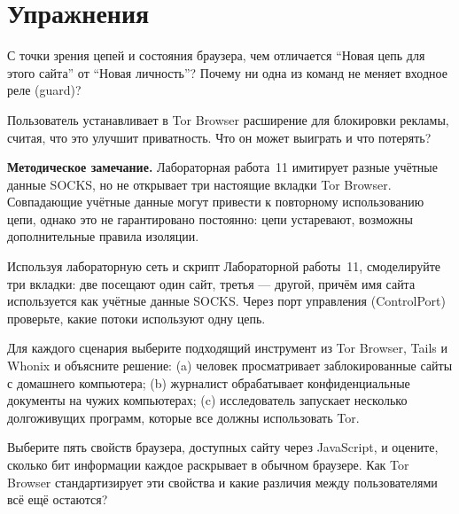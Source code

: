 \section*{Упражнения}

\begin{esercizio}[1]\label{es:23-identita}
С точки зрения цепей и состояния браузера, чем отличается \enquote{Новая цепь для этого сайта} от \enquote{Новая личность}? Почему ни одна из команд не меняет входное реле (guard)?
\end{esercizio}

\begin{esercizio}[1]\label{es:23-estensioni}
Пользователь устанавливает в Tor Browser расширение для блокировки рекламы, считая, что это улучшит приватность. Что он может выиграть и что потерять?
\end{esercizio}

\textbf{Методическое замечание.} Лабораторная работа~11 имитирует разные учётные данные SOCKS, но не открывает три настоящие вкладки Tor Browser. Совпадающие учётные данные могут привести к повторному использованию цепи, однако это не гарантировано постоянно: цепи устаревают, возможны дополнительные правила изоляции.

\begin{esercizio}[2]\label{es:23-isolamento}
Используя лабораторную сеть и скрипт Лабораторной работы~11, смоделируйте три вкладки: две посещают один сайт, третья — другой, причём имя сайта используется как учётные данные SOCKS. Через порт управления (ControlPort) проверьте, какие потоки используют одну цепь.
\end{esercizio}

\begin{esercizio}[2]\label{es:23-scelta}
Для каждого сценария выберите подходящий инструмент из Tor Browser, Tails и Whonix и объясните решение: (a) человек просматривает заблокированные сайты с домашнего компьютера; (b) журналист обрабатывает конфиденциальные документы на чужих компьютерах; (c) исследователь запускает несколько долгоживущих программ, которые все должны использовать Tor.
\end{esercizio}

\begin{esercizio}[3]\label{es:23-impronta}
Выберите пять свойств браузера, доступных сайту через JavaScript, и оцените, сколько бит информации каждое раскрывает в обычном браузере. Как Tor Browser стандартизирует эти свойства и какие различия между пользователями всё ещё остаются?
\end{esercizio}

